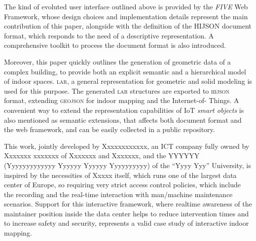 The kind of evoluted user interface outlined above is provided by the
\emph{FIVE} Web Framework, whose design choices and implementation details
represent the main contribution of this paper, alongside with the definition
of the HIJSON document format, which responds to the need of a descriptive
representation. A comprehensive toolkit to process the document format is also
introduced.

Moreover, this paper quickly outlines the generation of geometric data of a
complex building, to provide both an explicit semantic and a hierarchical
model of indoor spaces. \textsc{\large lar}, a general representation for
geometric and solid modeling is used for this purpose. The generated
\textsc{\large lar} structures are exported to \textsc{\large hijson} format,
extending \textsc{\large geojson} for indoor mapping and the Internet-of-
Things. A convenient way to extend the representation capabilities of IoT
\emph{smart objects} is also mentioned as semantic extensions, that affects
both document format and the web framework, and can be easily collected in a
public repository.




This work, jointly developed by Xxxxxxxxxxxx, an ICT
company fully owned by Xxxxxxx xxxxxxx of Xxxxxxx and Xxxxxxx, and the YYYYYY
(Yyyyyyyyyyyyy Yyyyyy Yyyyyy Yyyyyyyyyy) of the ``Yyyy Yyy'' University, is
inspired by the necessities of Xxxxx itself, which runs one of the largest
data center of Europe, so requiring very strict access control policies, which
include the recording and the real-time interaction with man/machine
maintenance scenarios. Support for this interactive framework, where realtime
awareness of the maintainer position inside the data center helps to reduce
intervention times and to increase safety and security, represents a valid
case study of interactive indoor mapping.

